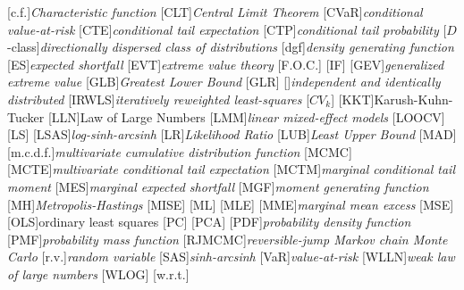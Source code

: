 [c.f.]{\textit{Characteristic function}}
[CLT]{\textit{Central Limit Theorem}}
[CVaR]{\textit{conditional value-at-risk}}
[CTE]{\textit{conditional tail expectation}}
[CTP]{\textit{conditional tail probability}}
[$D$-class]{\textit{directionally dispersed class of distributions}}
[dgf]{\textit{density generating function}}
[ES]{\textit{expected shortfall}}
[EVT]{\textit{extreme value theory}}
[F.O.C.]{}
[IF]{}
[GEV]{\textit{generalized extreme value}}
[GLB]{\textit{Greatest Lower Bound}}
[GLR]{}
[]{\textit{independent and identically distributed}}
[IRWLS]{\textit{iteratively reweighted least-squares}}
[$CV_k$]{}
[KKT]{Karush-Kuhn-Tucker}
[LLN]{Law of Large Numbers}
[LMM]{\textit{linear mixed-effect models}}
[LOOCV]{}
[LS]{}
[LSAS]{\textit{log-sinh-arcsinh}}
[LR]{\textit{Likelihood Ratio}}
[LUB]{\textit{Least Upper Bound}}
[MAD]{}
[m.c.d.f.]{\textit{multivariate cumulative distribution function}}
[MCMC]{}
[MCTE]{\textit{multivariate conditional tail expectation}}
[MCTM]{\textit{marginal conditional tail moment}}
[MES]{\textit{marginal expected shortfall}}
[MGF]{\textit{moment generating function}}
[MH]{\textit{Metropolis-Hastings}}
[MISE]{}
[ML]{}
[MLE]{}
[MME]{\textit{marginal mean excess}}
[MSE]{}
[OLS]{ordinary least squares}
[PC]{}
[PCA]{}
[PDF]{\textit{probability density function}}
[PMF]{\textit{probability mass function}}
[RJMCMC]{\textit{reversible-jump Markov chain Monte Carlo}}
[r.v.]{\textit{random variable}}
[SAS]{\textit{sinh-arcsinh}}
[VaR]{\textit{value-at-risk}}
[WLLN]{\textit{weak law of large numbers}}
[WLOG]{}
[w.r.t.]{}